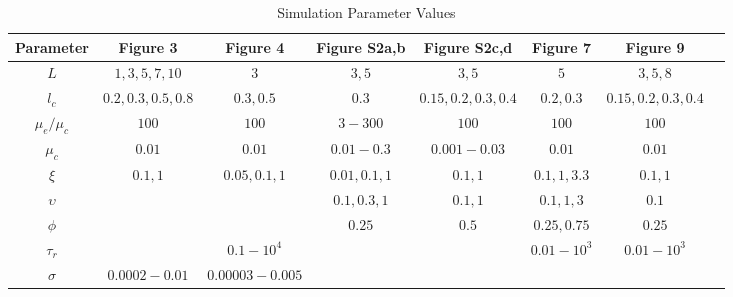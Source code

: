 \begin{table}[h]
	\begin{adjustwidth}{-2.25in}{0in}
		\centering
		\caption{Simulation Parameter Values}
		\label{table:para2}
		\begin{tabular}{|c|ccccccc|}
			\hline
			Parameter     & \textbf{Figure 3}          & \textbf{Figure 4}       & \textbf{Figure S2a,b}    & \textbf{Figure S2c,d}     & \textbf{Figure 7}    & \textbf{Figure 9}          \\ \hline
			$L$           & $1,3,5,7,10$      & $3$             & $3,5$         & $3,5$                 & $5$         & $3,5,8$            \\ 
			$l_c$         & $0.2,0.3,0.5,0.8$ & $0.3,0.5$       & $0.3$       & $0.15,0.2,0.3,0.4$ & $0.2,0.3$        & $0.15,0.2,0.3,0.4$ \\ 
			$\mu_e/\mu_c$ & $100$             & $100$           & $3-300$     & $100$     & $100$           & $100$              \\ 
			$\mu_c$       & $0.01$            & $0.01$          & $0.01-0.3$  & $0.001-0.03$       & $0.01$      & $0.01$             \\ 
			$\xi$         & $0.1,1$          & $0.05,0.1,1$      & $0.01,0.1,1$  & $0.1,1$  & $0.1,1,3.3$   & $0.1,1$           \\ 
			$\upsilon$    & ~                 & ~               & $0.1,0.3,1$ & $0.1,1$   & $0.1,1,3$    & $0.1$              \\ 
			$\phi$        & ~                 & ~               & $0.25$      & $0.5$     & $0.25,0.75$    & $0.25$             \\ 
			$\tau_r$      & ~                 & $0.1-10^4$      & ~           & ~         & $0.01-10^3$  & $0.01-10^3$              \\ 
			$\sigma$      & $0.0002-0.01$     & $0.00003-0.005$ & ~           & ~         & ~            & ~                          \\
			\hline
		\end{tabular}
	\end{adjustwidth}
\end{table}



